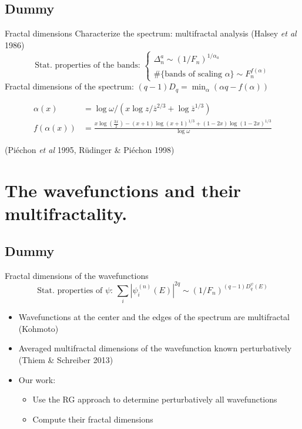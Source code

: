\documentclass[xcolor=x11names,compress,professionalfonts]{beamer}
\renewcommand{\(}{\begin{columns}}
\renewcommand{\)}{\end{columns}}
\newcommand{\<}[1]{\begin{column}{#1}}
\renewcommand{\>}{\end{column}}
\newcommand{\zb}{\ensuremath{\overline{z}}}
\begin{document}
\subsection{Dummy}
\begin{frame}{Fractal dimensions}
	Characterize the spectrum: multifractal analysis (Halsey \emph{et al} 1986)
	\[
	\text{Stat. properties of the bands:~} 
	\begin{cases}
	\Delta_n^a \sim (1/F_n)^{1/\alpha_a} \\
	\#\{\text{bands of scaling~} \alpha \} \sim F_n^{f(\alpha)} 
	\end{cases}
	\]
	Fractal dimensions of the spectrum: $(q-1)D_q = \min_\alpha(\alpha q - f(\alpha))$
	
	\begin{align*}
		\alpha(x) &= \log \omega/\left( x \log z/\zb^{2/3} + \log \zb^{1/3} \right) \\
		f(\alpha(x)) &= \frac{x \log \left(\frac{3 x}{2}\right)- (x+1) \log (x+1)^{1/3}+ (1-2 x) \log (1-2 x)^{1/3}}{\log \omega}
	\end{align*}
	
	\begin{flushright}
	(Piéchon \emph{et al} 1995, Rüdinger \& Piéchon 1998)
	\end{flushright}
\end{frame}

\section{The wavefunctions and their multifractality.}
\subsection{Dummy}
\begin{frame}{Fractal dimensions of the wavefunctions}
	\[
	\text{Stat. properties of $\psi$:~} 
	\sum_i |\psi_i^{(n)}(E)|^{2q} \sim (1/F_n)^{(q-1)D_q^\psi(E)} 
	\]
\begin{itemize}
	\item Wavefunctions at the center and the edges of the spectrum are multifractal (Kohmoto)
	\item Averaged multifractal dimensions of the wavefunction known perturbatively (Thiem \& Schreiber 2013)
	\item Our work:
	\begin{itemize}
		\item Use the RG approach to determine perturbatively all wavefunctions
		\item Compute their fractal dimensions
	\end{itemize}
\end{itemize}
\end{frame}
\end{document}
